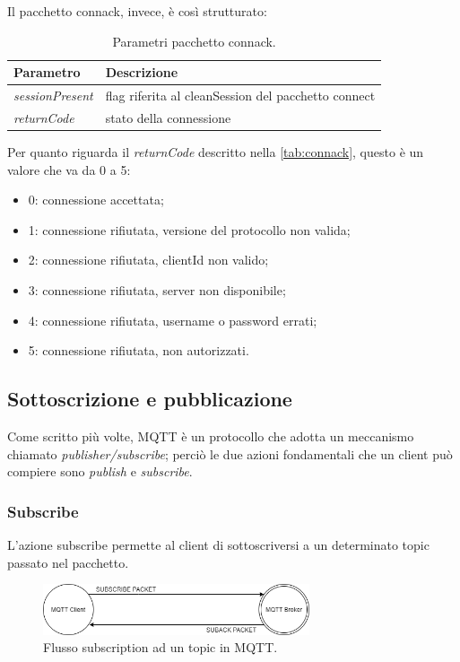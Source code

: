 \documentclass[binding=0.6cm,TFA]{sapthesis}
\begin{document}
\begin{large}
Il pacchetto connack, invece, è così strutturato: \\
\begin{table}[h]
\caption{Parametri pacchetto connack.}
\label{tab:connack}
\begin{tabular}{lp{}}
\toprule
\textbf{Parametro} & \textbf{Descrizione} \\
\midrule
\textit{sessionPresent} & flag riferita al cleanSession del pacchetto connect \\
\textit{returnCode} & stato della connessione \\
\bottomrule
\end{tabular}
\end{table}

Per quanto riguarda il \textit{returnCode} descritto nella \autoref{tab:connack}, questo è un valore che va da 0 a 5:
\begin{itemize}
\item 0: connessione accettata;
\item 1: connessione rifiutata, versione del protocollo non valida;
\item 2: connessione rifiutata, clientId non valido;
\item 3: connessione rifiutata, server non disponibile;
\item 4: connessione rifiutata, username o password errati;
\item 5: connessione rifiutata, non autorizzati.
\end{itemize}

\subsection{Sottoscrizione e pubblicazione}
Come scritto più volte, MQTT è un protocollo che adotta un meccanismo chiamato \textit{publisher/subscribe}; perciò le due azioni fondamentali che un client può compiere sono \textit{publish} e \textit{subscribe}.
\subsubsection{Subscribe}
L'azione subscribe permette al client di sottoscriversi a un determinato topic passato nel pacchetto.

\begin{figure}[h]
\centering
\includegraphics[width=0.7\textwidth]{images/subscribe-suback.png}
\caption{Flusso subscription ad un topic in MQTT.}
\label{fig:subscribe-suback}
\end{figure}


\end{large}
\end{document}
